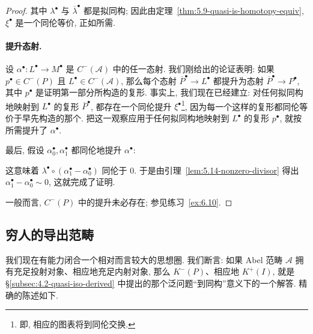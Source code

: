 \begin{proof}
\noindent 其中 $\lambda^\bullet$ 与 $\overline\lambda^\bullet$ 都是拟同构; 因此由定理~\ref{thm:5.9-quasi-is-homotopy-equiv}, $\xi^\bullet$ 是一个同伦等价, 正如所需.

\paragraph{提升态射.} 设 $\alpha^\bullet:L^\bullet\to M^\bullet$ 是 $C^{-}(\mathcal{A})$ 中的任一态射. 我们刚给出的论证表明: 如果 $p^\bullet\in C^{-}(P)$ 且 $L^\bullet\in C^{-}(\mathcal{A})$, 那么每个态射 $\overline P^\bullet\to L^\bullet$ 都提升为态射 $\overline P^\bullet\to P^\bullet$, 其中 $p^\bullet$ 是证明第一部分所构造的复形. 事实上, 我们现在已经建立: 对任何拟同构地映射到 $L^\bullet$ 的复形 $\overline P^\bullet$, 都存在一个同伦提升 $\xi^\bullet$\footnote{即, 相应的图表将到同伦交换.}, 因为每一个这样的复形都同伦等价于早先构造的那个. 把这一观察应用于任何拟同构地映射到 $L^\bullet$ 的复形 $p^\bullet$, 就按所需提升了 $\alpha^\bullet$.

最后, 假设 $\alpha^\bullet_0,\alpha^\bullet_1$ 都同伦地提升 $\alpha^\bullet$:

\begin{center}
\end{center}

\noindent 这意味着 $\lambda^\bullet\circ(\alpha^\bullet_1-\alpha^\bullet_0)$ 同伦于 $0$. 于是由引理~\ref{lem:5.14-nonzero-divisor} 得出 $\alpha^\bullet_1-\alpha^\bullet_0\sim 0$, 这就完成了证明.

\noindent 一般而言, $C^{-}(P)$ 中的提升未必存在; 参见练习~\ref{ex:6.10}.
\end{proof}

\subsection{穷人的导出范畴}
\label{subsec:6.3-poor-mans}

我们现在有能力闭合一个相对而言较大的思想圈. 我们断言: 如果 Abel 范畴 $\mathcal{A}$ 拥有充足投射对象、相应地充足内射对象, 那么 $K^{-}(P)$、相应地 $K^{+}(I)$, 就是 \S\ref{subsec:4.2-quasi-iso-derived} 中提出的那个泛问题``到同构''意义下的一个解答. 精确的陈述如下.

